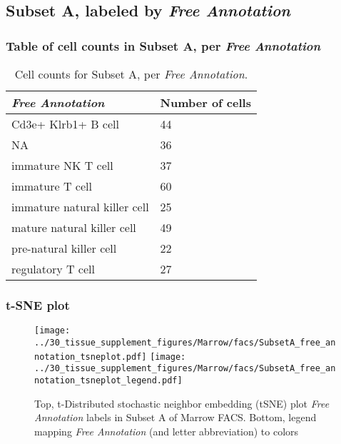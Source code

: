 \clearpage

\subsection{Subset A, labeled by \emph{Free Annotation}}
\subsubsection{Table of cell counts in Subset A, per \emph{Free Annotation}}\begin{table}[h]
\centering
\label{my-label}
\begin{tabular}{@{}ll@{}}
\toprule

\emph{Free Annotation}& Number of cells \\ \midrule
Cd3e+ Klrb1+ B cell & 44 \\

NA & 36 \\

immature NK T cell & 37 \\

immature T cell & 60 \\

immature natural killer cell & 25 \\

mature natural killer cell & 49 \\

pre-natural killer cell & 22 \\

regulatory T cell & 27 \\
\bottomrule
\end{tabular}
\caption{Cell counts for Subset A, per \emph{Free Annotation}.}
\end{table}

\clearpage
\subsubsection{t-SNE plot}
\begin{figure}[h]
\centering
\texttt{[image: ../30\_tissue\_supplement\_figures/Marrow/facs/SubsetA\_free\_annotation\_tsneplot.pdf]}
\texttt{[image: ../30\_tissue\_supplement\_figures/Marrow/facs/SubsetA\_free\_annotation\_tsneplot\_legend.pdf]}
\caption{Top, t-Distributed stochastic neighbor embedding (tSNE) plot  \emph{Free Annotation} labels in Subset A of Marrow FACS. Bottom, legend mapping \emph{Free Annotation} (and letter abbreviation) to colors}
\end{figure}


